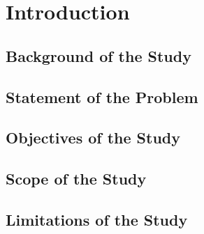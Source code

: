 \chapter{Introduction}

\section{Background of the Study}

\section{Statement of the Problem}

\section{Objectives of the Study}

\section{Scope of the Study}

\section{Limitations of the Study}
